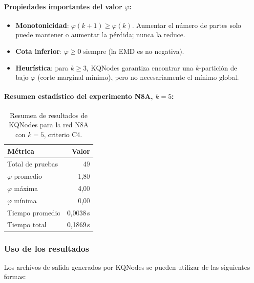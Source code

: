 \paragraph{Propiedades importantes del valor $\varphi$:}

\begin{itemize}
  \item \textbf{Monotonicidad}: $\varphi(k+1) \geq \varphi(k)$. Aumentar el número
        de partes solo puede mantener o aumentar la pérdida; nunca la reduce.
  \item \textbf{Cota inferior}: $\varphi \geq 0$ siempre (la EMD es no negativa).
  \item \textbf{Heurística}: para $k \geq 3$, KQNodes garantiza encontrar una
        $k$-partición de bajo $\varphi$ (corte marginal mínimo), pero no
        necesariamente el mínimo global.
\end{itemize}

\paragraph{Resumen estadístico del experimento N8A, $k=5$:}

\begin{table}[h!]
\centering
\begin{tabular}{|l|r|}
\hline
\textbf{Métrica} & \textbf{Valor} \\
\hline
Total de pruebas     & 49 \\
$\varphi$ promedio   & 1{,}80 \\
$\varphi$ máxima     & 4{,}00 \\
$\varphi$ mínima     & 0{,}00 \\
Tiempo promedio      & 0{,}0038\,s \\
Tiempo total         & 0{,}1869\,s \\
\hline
\end{tabular}
\caption{Resumen de resultados de KQNodes para la red N8A con $k=5$, criterio C4.}
\label{tab:resumen_n8a_k5}
\end{table}

\subsubsection{Uso de los resultados}

Los archivos de salida generados por KQNodes se pueden utilizar de las
siguientes formas:


